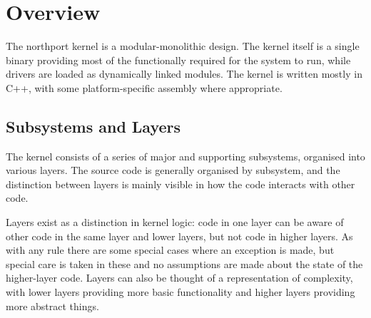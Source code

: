 \section{Overview}
The northport kernel is a modular-monolithic design. The kernel itself is a single binary providing most of the functionally required for the system to run, while drivers are loaded as dynamically linked modules. The kernel is written mostly in C++, with some platform-specific assembly where appropriate.

\subsection{Subsystems and Layers}
The kernel consists of a series of major and supporting subsystems, organised into various layers. The source code is generally organised by subsystem, and the distinction between layers is mainly visible in how the code interacts with other code.

Layers exist as a distinction in kernel logic: code in one layer can be aware of other code in the same layer and lower layers, but not code in higher layers. As with any rule there are some special cases where an exception is made, but special care is taken in these and no assumptions are made about the state of the higher-layer code. Layers can also be thought of a representation of complexity, with lower layers providing more basic functionality and higher layers providing more abstract things.

